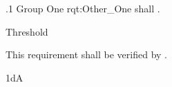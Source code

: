 \ONERQMTV
{\RqtNumberBase.1}
{Group One}
{rqt:Other_One}
{\ThisSys shall \TBD.}
{
	\item [Phase 1] Threshold
}
{This requirement shall be verified by \TBD.}
{
	\item [\cite{ref__BDP_FOS_CDD}] \TBD
}
{
	\item \TBD
}
{1dA}

